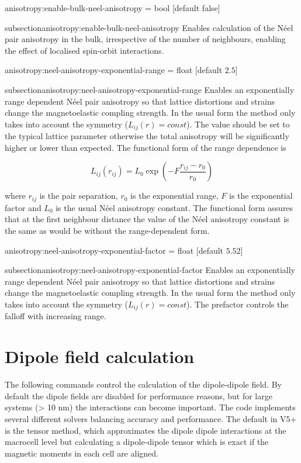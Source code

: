 {\zicf anisotropy:enable-bulk-neel-anisotropy = bool [default false]}
{subsection}{anisotropy:enable-bulk-neel-anisotropy} Enables calculation of the
N\'eel pair anisotropy in the bulk, irrespective of the number of neighbours,
enabling the effect of localised spin-orbit interactions.

{\zicf anisotropy:neel-anisotropy-exponential-range = float [default $2.5$]}
{subsection}{anisotropy:neel-anisotropy-exponential-range} Enables an
exponentially range dependent N\'eel pair anisotropy so that lattice distortions
and strains change the magnetoelastic compling strength. In the usual form the
method only takes into account the symmetry ($L_{ij}(r) = const$). The value
should be set to the typical lattice parameter otherwise the total anisotropy
will be significantly higher or lower than expected. The functional form of the
range dependence is

\begin{equation}
   L_{ij}(r_{ij}) = L_0 \exp\left(-F\frac{r_{ij} - r_0}{r_{0}}\right)
\end{equation}

\noindent where $r_{ij}$ is the pair separation, $r_0$ is the exponential range,
$F$ is the exponential factor and $L_0$ is the usual N\'eel anisotropy constant.
The functional form assures that at the first neighbour distance the value of
the N\'eel anisotropy constant is the same as would be without the
range-dependent form.

{\zicf anisotropy:neel-anisotropy-exponential-factor = float [default $5.52$]}
{subsection}{anisotropy:neel-anisotropy-exponential-factor} Enables an
exponentially range dependent N\'eel pair anisotropy so that lattice distortions
and strains change the magnetoelastic compling strength. In the usual form the
method only takes into account the symmetry ($L_{ij}(r) = const$). The prefactor
controls the falloff with increasing range.

\section*{Dipole field calculation}
The following commands control the calculation of the dipole-dipole field. By
default the dipole fields are disabled for performance reasons, but for large
systems (> 10 nm) the interactions can become important. The \vampire code
implements several different solvers balancing accuracy and performance. The
default in V5+ is the tensor method, which approximates the dipole dipole
interactions at the macrocell level but calculating a dipole-dipole tensor which
is exact if the magnetic moments in each cell are aligned.

